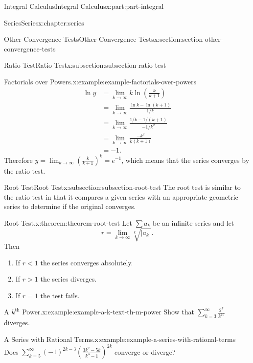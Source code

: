 \documentclass[twoside,10pt,]{book}
\numberwithin{equation}{part}
\newcommand{\lt}{<}
\newcommand{\gt}{>}
\newcommand{\amp}{&}
\begin{document}
\begin{partptx}{Integral Calculus}{}{Integral Calculus}{}{}{x:part:part-integral}
\begin{chapterptx}{Series}{}{Series}{}{}{x:chapter:series}
\begin{sectionptx}{Other Convergence Tests}{}{Other Convergence Tests}{}{}{x:section:section-other-convergence-tests}
\begin{subsectionptx}{Ratio Test}{}{Ratio Test}{}{}{x:subsection:subsection-ratio-test}
\begin{example}{Factorials over Powers.}{x:example:example-factorials-over-powers}
\begin{align*}
\ln y \amp = \lim_{k\to\infty}k\ln\left(\frac{k}{k+1}\right) \\
\amp = \lim_{k\to\infty}\frac{\ln k - \ln(k+1)}{1/k} \\
\amp = \lim_{k\to\infty}\frac{1/k - 1/(k+1)}{-1/k^{2}} \\
\amp = \lim_{k\to\infty}\frac{-k^{2}}{k(k+1)} \\
\amp = -1 \text{.}
\end{align*}
Therefore \(y = \lim_{k\to\infty}\left(\frac{k}{k+1}\right)^{k} = e^{-1}\), which means that the series converges by the ratio test.%
\end{example}
\end{subsectionptx}
%
%
\typeout{************************************************}
\typeout{************************************************}
%
\begin{subsectionptx}{Root Test}{}{Root Test}{}{}{x:subsection:subsection-root-test}
The root test is similar to the ratio test in that it compares a given series with an appropriate geometric series to determine if the original converges.%
\begin{theorem}{Root Test.}{}{x:theorem:theorem-root-test}%
Let \(\sum a_{k}\) be an infinite series and let%
\begin{equation*}
r = \lim_{k\to\infty}\sqrt[k]{|a_{k}|}\text{.}
\end{equation*}
Then%
\begin{enumerate}
\item{}If \(r \lt 1\) the series converges absolutely.%
\item{}If \(r \gt 1\) the series diverges.%
\item{}If \(r = 1\) the test fails.%
\end{enumerate}
%
\end{theorem}
\begin{example}{A \(k^{\text{th}}\) Power.}{x:example:example-a-k-text-th-m-power}%
Show that \(\sum_{k=3}^{\infty}\frac{2^{k}}{k^{10}}\) diverges.%
\end{example}
\begin{example}{A Series with Rational Terms.}{x:example:example-a-series-with-rational-terms}%
Does \(\sum_{k=5}^{\infty}(-1)^{2k - 3}\left(\frac{3k^{2} - 5k}{k^{3} - 1}\right)^{2k}\) converge or diverge?%
\end{example}
\end{subsectionptx}
\end{sectionptx}
%
%
\typeout{************************************************}

\end{chapterptx}
\end{partptx}
\end{document}
